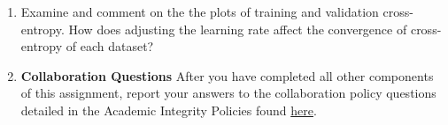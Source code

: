 \begin{enumerate}
\item {} 
Examine and comment on the the plots of training and validation cross-entropy. How does adjusting the learning rate affect the convergence of cross-entropy of each dataset?

\begin{tcolorbox}[fit,height=4cm,blank, borderline={1pt}{-2pt},nobeforeafter]
        \end{tcolorbox}

\item {\bf Collaboration Questions} After you have completed all other components of this assignment, report your answers to the collaboration policy questions detailed in the Academic Integrity Policies found \href{http://www.cs.cmu.edu/~mgormley/courses/10601-s18/about.html#7-academic-integrity-policies}{here}.
    
    \begin{tcolorbox}[fit,height=3cm,blank, borderline={1pt}{-2pt},nobeforeafter]
    \end{tcolorbox}

\end{enumerate}

